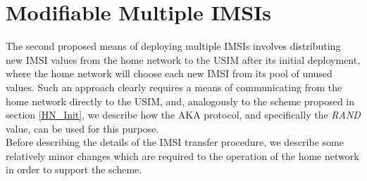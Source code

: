 \documentclass{acm_proc_article-sp}
\begin{document}
\section{Modifiable Multiple IMSIs} \label{Proposal-MM-IMSI}

The second proposed means of deploying multiple IMSIs involves distributing new IMSI values from the home network to the USIM after its initial deployment, where the home network will choose each new IMSI from its pool of unused values. Such an approach clearly requires a means of communicating from the home network directly to the USIM, and, analogously to the scheme proposed in section \ref{HN_Init}, we describe how the AKA protocol, and specifically the \emph{RAND} value, can be used for this purpose. \\ 

Before describing the details of the IMSI transfer procedure, we describe some relatively minor changes which are required to the operation of the home network in order to support the scheme.
\end{document}

